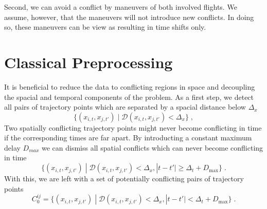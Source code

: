 \documentclass[aps,pra,twocolumn,10pt]{revtex4-1}
\begin{document}
Second, we can avoid a conflict by maneuvers of both involved flights.
We assume, however, that the maneuvers will not introduce new conflicts. 
In doing so, these maneuvers can be view as resulting in time shifts only.

\section{Classical Preprocessing}
It is beneficial to reduce the data to conflicting regions in space and decoupling the spacial and temporal components of the problem.
As a first step, we detect all pairs of trajectory points which are separated by a spacial distance below $\Delta_x$ 
\begin{equation*}
    \{ (x_{i, t},  x_{j, t'}) \; | \; \mathcal{D} (x_{i, t}, x_{j, t'}) < \Delta_x \} \; ,
\end{equation*}
Two spatially conflicting trajectory points might never become conflicting in time if the corresponding times are far apart.
By introducting a constant maximum delay $D_{max}$ we can dismiss all spatial conflicts which can never become conflicting in time
\begin{equation*}
    \{ (x_{i, t},  x_{j, t'}) \; | \; \mathcal{D} (x_{i, t}, x_{j, t'}) < \Delta_x , |t-t'| \geq \Delta_t + D_\text{max} \} \; .
\end{equation*}
With this, we are left with a set of potentially conflicting pairs of trajectory points
\begin{equation*}
    C^{ij}_0 = \{ (x_{i, t},  x_{j, t'}) \; | \; \mathcal{D} (x_{i, t}, x_{j, t'}) < \Delta_x , |t-t'| < \Delta_t + D_\text{max} \} \; .
\end{equation*}
\end{document}

